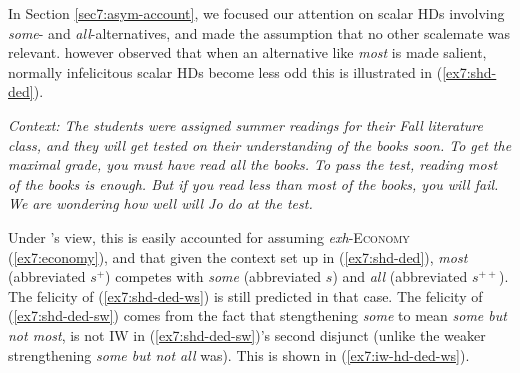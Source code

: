 In Section \ref{sec7:asym-account}, we focused our attention on scalar HDs involving \textit{some}- and \textit{all}-alternatives, and made the assumption that no other scalemate was relevant. \citet{Fox2018} however observed that when an alternative like \textit{most} is made salient, normally infelicitous scalar HDs become less odd this is illustrated in (\ref{ex7:shd-ded}).

\begin{exe}
	\ex\label{ex7:shd-ded} \textit{Context: The students were assigned summer readings for their Fall literature class, and they will get tested on their understanding of the books soon. To get the maximal grade, you must have read all the books. To pass the test, reading most of the books is enough. But if you read less than most of the books, you will fail. We are wondering how well will Jo do at the test.}
	\begin{xlist}
		\label{ex7:shd-ded-ws}
		\label{ex7:shd-ded-sw}
	\end{xlist}
\end{exe}

Under \citet{Fox2018}'s view, this is easily accounted for assuming \textit{exh}-\textsc{Economy} (\ref{ex7:economy}), and that given the context set up in (\ref{ex7:shd-ded}), \textit{most} (abbreviated $s^+$) competes with \textit{some} (abbreviated $s$) and \textit{all} (abbreviated $s^{++}$). The felicity of (\ref{ex7:shd-ded-ws}) is still predicted in that case. The felicity of (\ref{ex7:shd-ded-sw}) comes from the fact that stengthening \textit{some} to mean \textit{some but not most}, is not IW in  (\ref{ex7:shd-ded-sw})'s second disjunct (unlike the weaker strengthening \textit{some but not all} was). This is shown in (\ref{ex7:iw-hd-ded-ws}).

